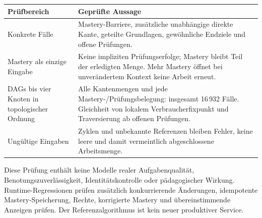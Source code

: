 \begin{center}\begin{tabularx}{\linewidth}{@{}P{40mm}X@{}}
\toprule
Prüfbereich & Geprüfte Aussage\\
\midrule
Konkrete Fälle & Mastery-Barriere, zusätzliche unabhängige direkte Kante,
geteilte Grundlagen, gewöhnliche Endziele und offene Prüfungen.\\
Mastery als einzige Eingabe & Keine impliziten Prüfungserfolge;
Mastery bleibt Teil der erledigten Menge. Mehr Mastery öffnet bei
unverändertem Kontext keine Arbeit erneut.\\
DAGs bis vier Knoten in topologischer Ordnung & Alle Kantenmengen und
jede Mastery-/Prüfungsbelegung: insgesamt 16\,932 Fälle. Gleichheit von
lokalem Verbraucherfixpunkt und Traversierung ab offenen Prüfungen.\\
Ungültige Eingaben & Zyklen und unbekannte Referenzen bleiben Fehler,
keine leere und damit vermeintlich abgeschlossene Arbeitsmenge.\\
\bottomrule
\end{tabularx}\end{center}

Diese Prüfung enthält keine Modelle realer Aufgabenqualität,
Benotungszuverlässigkeit, Identitätskontrolle oder pädagogischer Wirkung.
Runtime-Regressionen prüfen zusätzlich konkurrierende Änderungen,
idempotente Mastery-Speicherung, Rechte, korrigierte Mastery und
übereinstimmende Anzeigen prüfen. Der Referenzalgorithmus
ist kein neuer produktiver Service.

